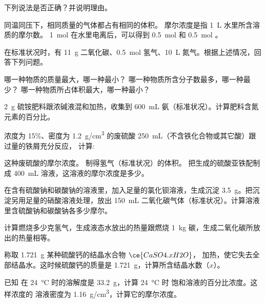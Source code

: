 \begin{Review}
  \begin{question}
    \item 下列说法是否正确？并说明理由。
    \begin{tasks}
      \task 同温同压下，相同质量的气体都占有相同的体积。
      \task 摩尔浓度是指 \qty{1}{L} 水里所含溶质的摩尔数。
      \task \qty{1}{mol}  在水里电离后，可以得到 \qty{0.5}{mol}  和 \qty{0.5}{mol} 。
    \end{tasks}
    \item 在标准状况时，有 \qty{11}{g} 二氧化碳、\qty{0.5}{mol} 氢气、\qty{10}{L} 氮气。根据上述情况，回答下列问题。
    \begin{tasks}
      \task 哪一种物质的质量最大，哪一种最小？
      \task 哪一种物质所含分子数最多，哪一种最少？
      \task 哪一种物质所占体积最大，哪一种最小？
    \end{tasks}
    \item \qty{2}{g} 硫铵肥料跟浓碱液混和加热，收集到 \qty{600}{mL} 氨（标准状况）。计算肥料含氮元素的百分比。
    \item 浓度为 15\%、密度为 \qty{1.2}{g/cm^3} 的废硫酸 \qty{250}{mL}（不含铁化合物或其它酸）跟过量的铁屑充分反应， 计算:
    \begin{tasks}
      \task 这种废硫酸的摩尔浓度。
      \task 制得氢气（标准状况）的体积。
      \task 把生成的硫酸亚铁配制成 \qty{400}{mL} 溶液，这溶液的摩尔浓度是多少。
    \end{tasks}
    \item 在含有硫酸钠和碳酸钠的溶液里，加入足量的氯化钡溶液，生成沉淀 \qty{3.5}{g}。把沉淀另用足量的硝酸溶液处理，放出 \qty{150}{mL} 二氧化碳气体（标准状况）。计算溶液里含硫酸钠和碳酸钠各多少摩尔。
    \item 计算燃烧多少克氢气，生成液态水放出的热量跟燃烧 \qty{1}{kg} 碳，生成二氧化碳所放出的热量相等。
    \item 称取 \qty{1.721}{g} 某种硫酸钙的结晶水合物 $\ce{CaSO4 .x H2O}$， 加热，使它失去全部结晶水。这时候硫酸钙的质量是 \qty{1.721}{g}，计算所含结晶水数（$x$）。
    \item 已知  在 \qty{24}{\celsius} 时的溶解度是 \qty{33.2}{g}，计算 \qty{24}{\celsius} 时  饱和溶液的百分比浓度。这样浓度的  溶液密度为 \qty{1.16}{g/cm^3}，计算它的摩尔浓度。
  \end{question}
\end{Review}